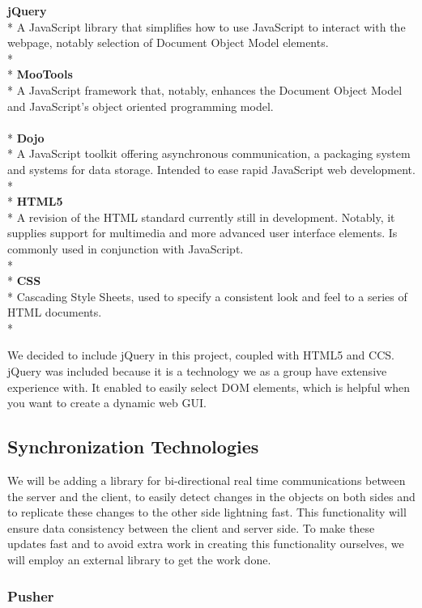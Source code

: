 \textbf{jQuery}\\*
A JavaScript library that simplifies how to use JavaScript to interact with the webpage, notably selection of Document Object Model elements.\\*
\\*
\textbf{MooTools}\\*
A JavaScript framework that, notably, enhances the Document Object Model and JavaScript's object oriented programming model.\\
\\*
\textbf{Dojo}\\*
A JavaScript toolkit offering asynchronous communication, a packaging system and systems for data storage. Intended to ease rapid JavaScript web development.\\*
\\*
\textbf{HTML5}\\*
A revision of the HTML standard currently still in development. Notably, it supplies support for multimedia and more advanced user interface elements. Is commonly used in conjunction with JavaScript.\\*
\\*
\textbf{CSS}\\*
Cascading Style Sheets, used to specify a consistent look and feel to a series of HTML documents.\\*

We decided to include jQuery in this project, coupled with HTML5 and CCS. jQuery was included because it is a technology we as a group have extensive experience with. It enabled to easily select DOM elements, which is helpful when you want to create a dynamic web GUI.

\subsection{Synchronization Technologies}
We will be adding a library for bi-directional real time communications between the server and the client, to easily detect changes in the objects on both sides and to replicate these changes to the other side lightning fast. This functionality will ensure data consistency between the client and server side. To make these updates fast and to avoid extra work in creating this functionality ourselves, we will employ an external library to get the work done.

\subsubsection{Pusher}

